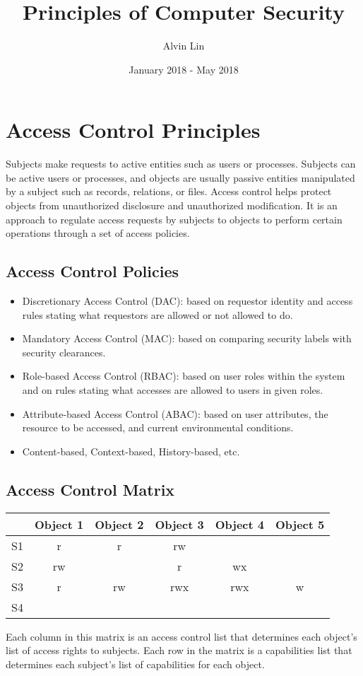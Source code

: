 \documentclass{math}
\title{Principles of Computer Security}
\author{Alvin Lin}
\date{January 2018 - May 2018}
\begin{document}
\maketitle

\section*{Access Control Principles}
Subjects make requests to active entities such as users or processes. Subjects
can be active users or processes, and objects are usually passive entities
manipulated by a subject such as records, relations, or files. Access control
helps protect objects from unauthorized disclosure and unauthorized
modification. It is an approach to regulate access requests by subjects to
objects to perform certain operations through a set of access policies.

\subsection*{Access Control Policies}
\begin{itemize}
  \item Discretionary Access Control (DAC): based on requestor identity and
  access rules stating what requestors are allowed or not allowed to do.
  \item Mandatory Access Control (MAC): based on comparing security labels
  with security clearances.
  \item Role-based Access Control (RBAC): based on user roles within the system
  and on rules stating what accesses are allowed to users in given roles.
  \item Attribute-based Access Control (ABAC): based on user attributes, the
  resource to be accessed, and current environmental conditions.
  \item Content-based, Context-based, History-based, etc.
\end{itemize}

\subsection*{Access Control Matrix}
\begin{center}
  \begin{tabular}{|c|c|c|c|c|c|}
    \hline
    & Object 1 & Object 2 & Object 3 & Object 4 & Object 5 \\
    \hline
    S1 & r & r & rw & & \\
    \hline
    S2 & rw & & r & wx & \\
    \hline
    S3 & r & rw & rwx & rwx & w \\
    \hline
    S4 & & & & & \\
    \hline
  \end{tabular}
\end{center}
Each column in this matrix is an access control list that determines each
object's list of access rights to subjects. Each row in the matrix is a
capabilities list that determines each subject's list of capabilities for each
object.
\end{document}
